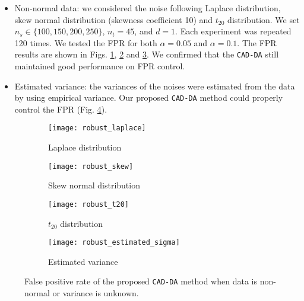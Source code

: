 \begin{itemize}
 \item  Non-normal data: we considered the noise following Laplace distribution, skew normal distribution (skewness coefficient 10) and $t_{20}$ distribution.
%
We set $n_s \in \{ 100, 150, 200, 250 \}$, $n_t = 45$, and $d = 1$.
%
Each experiment was repeated 120 times.
%
We tested the FPR for both $\alpha = 0.05$ and $\alpha = 0.1$. 
%
The FPR results are shown in Figs. \ref{fig:app_laplace}, \ref{fig:app_skew_normal} and \ref{fig:app_t_20}. 
%
We confirmed that the {\tt CAD-DA} still maintained good performance on FPR control.


 \item Estimated variance: 
%
the variances of the noises were estimated from the data by using empirical variance.
%
Our proposed {\tt CAD-DA} method could properly control the FPR (Fig. \ref{fig:app_unknown_sigma}). 
\end{itemize}


\begin{figure}[H]
\centering
\begin{subfigure}{0.3\linewidth}
\centering
\texttt{[image: robust\_laplace]}
\caption{Laplace distribution}
\label{fig:app_laplace}
\end{subfigure}
%
\begin{subfigure}{0.3\linewidth}
\centering
\texttt{[image: robust\_skew]}
\caption{Skew normal distribution}
\label{fig:app_skew_normal}
\end{subfigure}

\begin{subfigure}{0.3\linewidth}
\centering
\texttt{[image: robust\_t20]}
\caption{$t_{20}$ distribution}
\label{fig:app_t_20}
\end{subfigure}
%
\begin{subfigure}{0.3\linewidth}
\centering
\texttt{[image: robust\_estimated\_sigma]}
\caption{Estimated variance}
\label{fig:app_unknown_sigma}
\end{subfigure}
\caption{False positive rate of the proposed {\tt CAD-DA} method when data is non-normal or variance is unknown.}
\label{fig:violate_assumption}
\end{figure}







